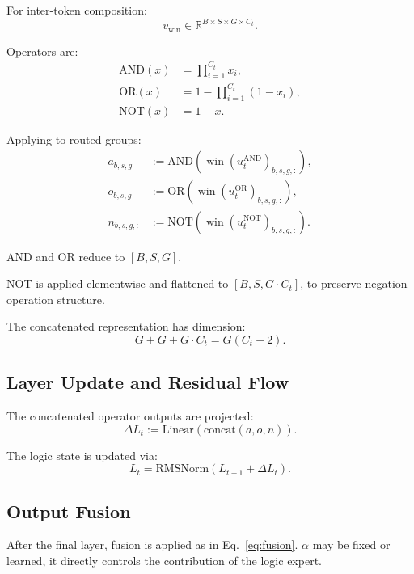 \documentclass[10pt,twocolumn,letterpaper]{article}
\begin{document}
For inter-token composition:
\begin{equation}
v_{\text{win}} \in \mathbb{R}^{B \times S \times G \times C_t}.
\end{equation}

Operators are:
\begin{align}
\text{AND}(x) &= \prod_{i=1}^{C_t} x_i, \\
\text{OR}(x) &= 1 - \prod_{i=1}^{C_t}(1 - x_i), \\
\text{NOT}(x) &= 1 - x.
\end{align}

Applying to routed groups:
\begin{align}
a_{b,s,g} &:= \text{AND}(\operatorname{win}(u_t^{\text{AND}})_{b,s,g,:}), \\
o_{b,s,g} &:= \text{OR}(\operatorname{win}(u_t^{\text{OR}})_{b,s,g,:}), \\
n_{b,s,g,:} &:= \text{NOT}(\operatorname{win}(u_t^{\text{NOT}})_{b,s,g,:}).
\end{align}

AND and OR reduce to $[B,S,G]$.

NOT is applied elementwise and flattened to $[B,S,G \cdot C_t]$, to preserve
negation operation structure.

The concatenated representation has dimension:
\begin{equation}
G + G + G \cdot C_t = G(C_t + 2).
\end{equation}

\subsection{Layer Update and Residual Flow}

The concatenated operator outputs are projected:
\begin{equation}
\Delta L_t := \text{Linear}(\text{concat}(a, o, n)).
\end{equation}

The logic state is updated via:
\begin{equation}
L_t = \mathrm{RMSNorm}(L_{t-1} + \Delta L_t).
\end{equation}

\subsection{Output Fusion}

After the final layer, fusion is applied as in Eq.~\ref{eq:fusion}.
$\alpha$ may be fixed or learned, it directly controls
the contribution of the logic expert.
\end{document}
